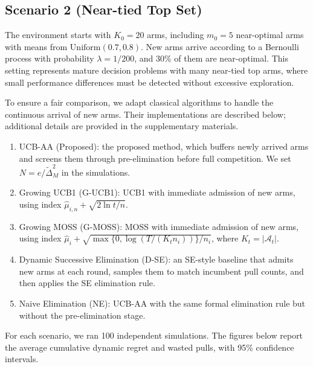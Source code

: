 \documentclass[11pt]{article}
\begin{document}
\subsection*{Scenario 2 (Near-tied Top Set)}
The environment starts with \(K_0=20\) arms, including \(m_0=5\) near-optimal
arms with means from \(\mathrm{Uniform}(0.7,0.8)\). New arms arrive according
to a Bernoulli process with probability \(\lambda=1/200\), and \(30\%\) of them
are near-optimal. This setting represents mature decision problems with many
near-tied top arms, where small performance differences must be detected without
excessive exploration.


To ensure a fair comparison, we adapt classical algorithms to handle the continuous arrival of new arms. Their implementations are described below; additional details are provided in the supplementary materials.
\begin{enumerate}

     \item UCB-AA (Proposed): the proposed method, which buffers newly arrived
     arms and screens them through pre-elimination before full competition. We
     set \(N=e/\tilde{\Delta}_M^2\) in the simulations.
    \item Growing UCB1 (G-UCB1): UCB1 \parencite{Auer2002FinitetimeAO} with
    immediate admission of new arms, using index
    \(\hat{\mu}_{i,n}+\sqrt{2\ln t/n}\).
    \item Growing MOSS (G-MOSS): MOSS \parencite{audibert2009minimax} with
    immediate admission of new arms, using index
    \(\hat{\mu}_i+\sqrt{\max\{0,\log(T/(K_t n_i))\}/n_i}\), where
    \(K_t=|\mathcal A_t|\).

\item Dynamic Successive Elimination (D-SE): an SE-style baseline
\parencite{PerchetRigollet2013} that admits new arms at each round, samples them
to match incumbent pull counts, and then applies the SE elimination rule.

\item Naive Elimination (NE): UCB-AA with the same formal elimination rule but
without the pre-elimination stage.


\end{enumerate}


For each scenario, we ran 100 independent simulations. The figures below report
the average cumulative dynamic regret and wasted pulls, with 95\% confidence
intervals.
\end{document}
